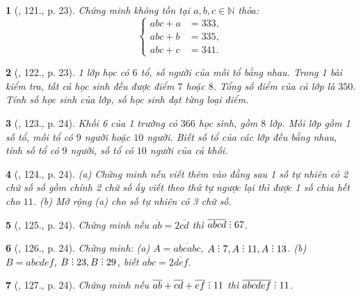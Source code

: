 \documentclass{article}
\newtheorem{baitoan}{}
\DeclareRobustCommand{\divby}{%
	\mathrel{\vbox{\baselineskip.65ex\lineskiplimit0pt\hbox{.}\hbox{.}\hbox{.}}}%
}
\begin{document}
\begin{baitoan}[\cite{Binh_Toan_6_tap_1}, 121., p. 23]
	Chứng minh không tồn tại $a,b,c\in\mathbb{N}$ thỏa:
	\begin{equation*}
		\left\{\begin{split}
			abc + a &= 333,\\
			abc + b &= 335,\\
			abc + c &= 341.
		\end{split}\right.
	\end{equation*}
\end{baitoan}

\begin{baitoan}[\cite{Binh_Toan_6_tap_1}, 122., p. 23]
	1 lớp học có $6$ tổ, số người của mỗi tổ bằng nhau. Trong 1 bài kiểm tra, tất cả học sinh đều được điểm $7$ hoặc $8$. Tổng số điểm của cả lớp là $350$. Tính số học sinh của lớp, số học sinh đạt từng loại điểm.
\end{baitoan}

\begin{baitoan}[\cite{Binh_Toan_6_tap_1}, 123., p. 24]
	Khối 6 của 1 trường có $366$ học sinh, gồm $8$ lớp. Mỗi lớp gồm 1 số tổ, mỗi tổ có $9$ người hoặc $10$ người. Biết số tổ của các lớp đều bằng nhau, tính số tổ có $9$ người, số tổ có $10$ người của cả khối.
\end{baitoan}

\begin{baitoan}[\cite{Binh_Toan_6_tap_1}, 124., p. 24]
	(a) Chứng minh nếu viết thêm vào đằng sau 1 số tự nhiên có 2 chữ số số gồm chính 2 chữ số ấy viết theo thứ tự ngược lại thì được 1 số chia hết cho $11$. (b) Mở rộng (a) cho số tự nhiên có 3 chữ số.
\end{baitoan}

\begin{baitoan}[\cite{Binh_Toan_6_tap_1}, 125., p. 24]
	Chứng minh nếu $\overline{ab} = 2\overline{cd}$ thì $\overline{abcd}\divby67$.
\end{baitoan}

\begin{baitoan}[\cite{Binh_Toan_6_tap_1}, 126., p. 24]
	Chứng minh: (a) $A = \overline{abcabc}$, $A\divby7,A\divby11,A\divby13$. (b) $B = \overline{abcdef}$, $B\divby23,B\divby29$, biết $\overline{abc} = 2\overline{def}$.
\end{baitoan}

\begin{baitoan}[\cite{Binh_Toan_6_tap_1}, 127., p. 24]
	Chứng minh nếu $\overline{ab} + \overline{cd} + \overline{ef}\divby11$ thì $\overline{abcdef}\divby11$.
\end{baitoan}
\end{document}

